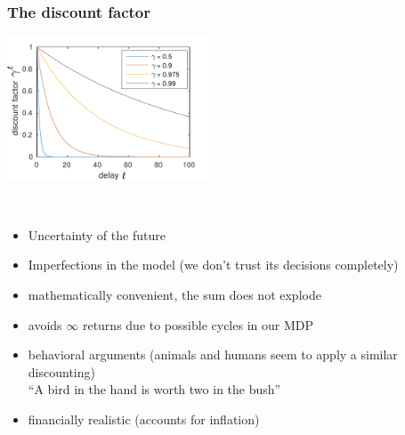 \begin{frame}\frametitle{The discount factor}
 


\begin{center}
\includegraphics[width=6cm]{img/delay_discount}
\label{fig:discount}
\end{center}

\slidesonly{\vspace{-3mm}}

\end{frame}

\begin{frame}

\\

\begin{itemize}
\item Uncertainty of the future
\item Imperfections in the model (we don't trust its decisions completely)
\item mathematically convenient, the sum does not explode
\item avoids $\infty$ returns due to possible cycles in our MDP
\item behavioral arguments (animals and humans seem to apply a similar discounting)\\
``A bird in the hand is worth two in the bush''
\item financially realistic (accounts for inflation)
\end{itemize}

\end{frame} 

